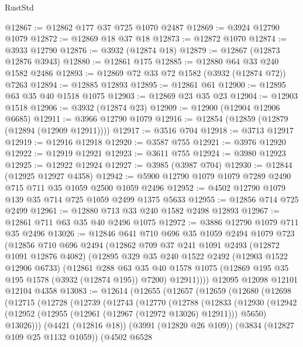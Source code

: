 \begin{lexlean}{RustStd}
\begin{coremodule}
@12867 := @12862 @177 @37 @725 @1070 @2487
@12869 := @3924 @12790 @1079
@12872 := @12869 @18 @37 @18
@12873 := @12872 @1070
@12874 := @3933 @12790
@12876 := @3932 (@12874 @18)
@12879 := @12867 (@12873 @12876 @3943)
@12880 := @12861 @175
@12885 := @12880 @64 @33 @240 @1582 @2486
@12893 := @12869 @72 @33 @72 @1582 (@3932 (@12874 @72)) @7263
@12894 := @12885 @12893
@12895 := @12861 @61
@12900 := @12895 @63 @35 @40 @1518 @1075
@12903 := @12869 @23 @35 @23
@12904 := @12903 @1518
@12906 := @3932 (@12874 @23)
@12909 := @12900 (@12904 @12906 @6685)
@12911 := @3966 @12790 @1079
@12916 := @12854 (@12859 (@12879 (@12894 (@12909 @12911))))
@12917 := @3516 @704
@12918 := @3713 @12917
@12919 := @12916 @12918
@12920 := @3587 @755
@12921 := @3976 @12920
@12922 := @12919 @12921
@12923 := @3611 @755
@12924 := @3980 @12923
@12925 := @12922 @12924
@12927 := @3985 (@3987 @704)
@12930 := @12844 (@12925 @12927 @4358)
@12942 := @5900 @12790 @1079 @1079 @7289 @2490 @715 @711 @35 @1059 @2500 @1059 @2496
@12952 := @4502 @12790 @1079 @139 @35 @714 @725 @1059 @2499 @1375 @5633
@12955 := @12856 @714 @725 @2499
@12961 := @12880 @713 @33 @240 @1582 @2498 @12893
@12967 := @12861 @711 @63 @35 @40 @2496 @1075
@12972 := @3886 @12790 @1079 @711 @35 @2496
@13026 := @12846
    @641
    @710
    @696
    @35
    @1059
    @2494
    @1079
    @723
    (@12856
      @710
      @696
      @2494
      (@12862
        @709
        @37
        @241
        @1091
        @2493
        (@12872 @1091 @12876 @4082)
        (@12895
          @329
          @35
          @240
          @1522
          @2492
          (@12903 @1522 @12906 @6733)
          (@12861
            @288
            @63
            @35
            @40
            @1578
            @1075
            (@12869 @195 @35 @195 @1578 (@3932 (@12874 @195)) @7200)
            @12911))))
    @12095
    @12098
    @12101
    @12104
    @4358
@13083 := @12614
    (@12655
      (@12657
        (@12659
          (@12680
            (@12698
              (@12715
                (@12728
                  (@12739
                    (@12743
                      (@12770
                        (@12788
                          (@12833
                            (@12930
                              (@12942
                                (@12952 (@12955 (@12961 (@12967 (@12972 @13026) @12911))) @5650)
                                @13026)))
                          (@4421 (@12816 @18))
                          (@3991 (@12820 @26 @109))
                          (@3834 (@12827 @109 @25 @1132 @1059))
                          (@4502
                            @6528

\end{coremodule}
\end{lexlean}
